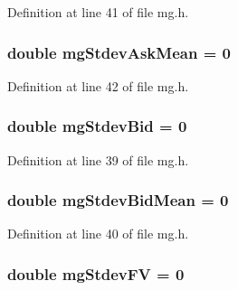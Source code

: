 Definition at line 41 of file mg.\+h.

\subsubsection[{\texorpdfstring{mg\+Stdev\+Ask\+Mean}{mgStdevAskMean}}]{\setlength{\rightskip}{0pt plus 5cm}double mg\+Stdev\+Ask\+Mean = 0}\hypertarget{class_k_1_1_m_g_a573fe2cde6d4be29b8adb62d9c6df216}{}\label{class_k_1_1_m_g_a573fe2cde6d4be29b8adb62d9c6df216}


Definition at line 42 of file mg.\+h.

\subsubsection[{\texorpdfstring{mg\+Stdev\+Bid}{mgStdevBid}}]{\setlength{\rightskip}{0pt plus 5cm}double mg\+Stdev\+Bid = 0}\hypertarget{class_k_1_1_m_g_a3c10d311c08f2978192402d961cc32aa}{}\label{class_k_1_1_m_g_a3c10d311c08f2978192402d961cc32aa}


Definition at line 39 of file mg.\+h.

\subsubsection[{\texorpdfstring{mg\+Stdev\+Bid\+Mean}{mgStdevBidMean}}]{\setlength{\rightskip}{0pt plus 5cm}double mg\+Stdev\+Bid\+Mean = 0}\hypertarget{class_k_1_1_m_g_a6eb5979883c311c60b4c02f8faa20185}{}\label{class_k_1_1_m_g_a6eb5979883c311c60b4c02f8faa20185}


Definition at line 40 of file mg.\+h.

\subsubsection[{\texorpdfstring{mg\+Stdev\+FV}{mgStdevFV}}]{\setlength{\rightskip}{0pt plus 5cm}double mg\+Stdev\+FV = 0}\hypertarget{class_k_1_1_m_g_a47f0036553b72247f6754ceddb5c113b}{}\label{class_k_1_1_m_g_a47f0036553b72247f6754ceddb5c113b}


